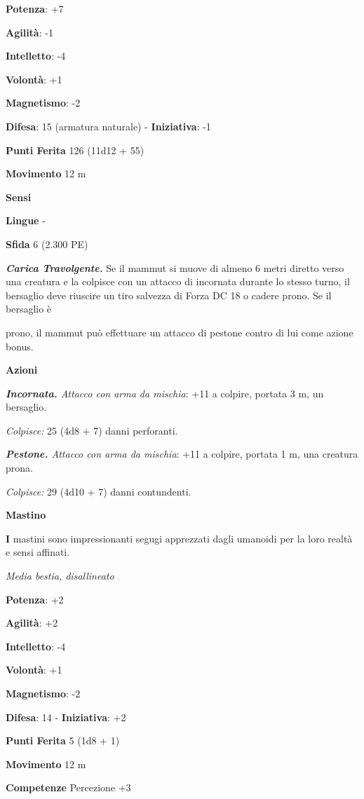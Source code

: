 \begin{multicols}{2}
\textbf{Potenza}: +7

\textbf{Agilità}: -1

\textbf{Intelletto}: -4

\textbf{Volontà}: +1

\textbf{Magnetismo}: -2

\textbf{Difesa}: 15 (armatura naturale) - \textbf{Iniziativa}: -1

\textbf{Punti Ferita} 126 (11d12 + 55)

\textbf{Movimento} 12 m

\textbf{Sensi} 

\textbf{Lingue} -

\textbf{Sfida} 6 (2.300 PE)\smallskip

\emph{\textbf{Carica Travolgente.}} Se il mammut si muove di almeno 6
metri diretto verso una creatura e la colpisce con un attacco di
incornata durante lo stesso turno, il bersaglio deve riuscire un tiro
salvezza di Forza DC 18 o cadere prono. Se il bersaglio è



prono, il mammut può effettuare un attacco di pestone contro di lui come
azione bonus.

\smallskip\textbf{Azioni}

\emph{\textbf{Incornata.} Attacco con arma da mischia}: +11 a colpire,
portata 3 m, un bersaglio.

\emph{Colpisce:} 25 (4d8 + 7) danni perforanti.

\emph{\textbf{Pestone.} Attacco con arma da mischia}: +11 a colpire,
portata 1 m, una creatura prona.

\emph{Colpisce:} 29 (4d10 + 7) danni contundenti.

\textbf{Mastino}

\textbf{I} mastini sono impressionanti segugi apprezzati dagli umanoidi
per la loro realtà e sensi affinati.

\emph{Media bestia, disallineato}

\textbf{Potenza}: +2

\textbf{Agilità}: +2

\textbf{Intelletto}: -4

\textbf{Volontà}: +1

\textbf{Magnetismo}: -2

\textbf{Difesa}: 14 - \textbf{Iniziativa}: +2

\textbf{Punti Ferita} 5 (1d8 + 1)

\textbf{Movimento} 12 m

\textbf{Competenze} Percezione +3


\end{multicols}
